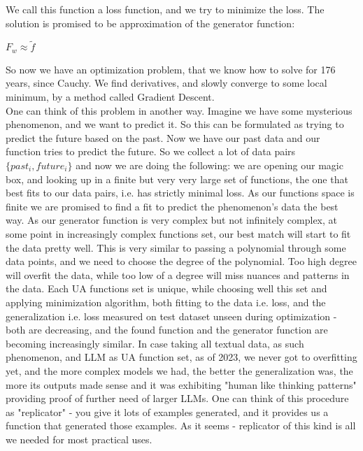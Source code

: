 \documentclass{article}
\begin{document}
We call this function a loss function, and we try to minimize the loss. The solution is promised to be approximation of the generator function:
\begin{center}$F_w\approx\tilde{f}$\end{center}

So now we have an optimization problem, that we know how to solve for 176 years, since Cauchy. We find derivatives, and slowly converge to some local minimum, by a method called Gradient Descent\cite{lemarechal2010cauchy}. \\

One can think of this problem in another way. Imagine we have some mysterious phenomenon, and we want to predict it. So this can be formulated as trying to predict the future based on the past. Now we have our past data and our function tries to predict the future. So we collect a lot of data pairs $\{past_i, future_i\}$ and now we are doing the following: we are opening our magic box, and looking up in a finite but very very large set of functions, the one that best fits to our data pairs, i.e. has strictly minimal loss. As our functions space is finite we are promised to find a fit to predict the phenomenon's data the best way. As our generator function is very complex but not infinitely complex, at some point in increasingly complex functions set, our best match will start to fit the data pretty well. This is very similar to passing a polynomial through some data points, and we need to choose the degree of the polynomial. Too high degree will overfit the data, while too low of a degree will miss nuances and patterns in the data. Each UA functions set is unique, while choosing well this set and applying minimization algorithm, both fitting to the data i.e. loss, and the generalization i.e. loss measured on test dataset unseen during optimization - both are decreasing, and the found function and the generator function are becoming increasingly similar. In case taking all textual data, as such phenomenon, and LLM as UA function set, as of 2023, we never got to overfitting yet, and the more complex models we had, the better the generalization was, the more its outputs made sense and it was exhibiting "human like thinking patterns" providing proof of further need of larger LLMs. One can think of this procedure as "replicator" - you give it lots of examples generated, and it provides us a function that generated those examples. As it seems - replicator of this kind is all we needed for most practical uses. \\
\end{document}
